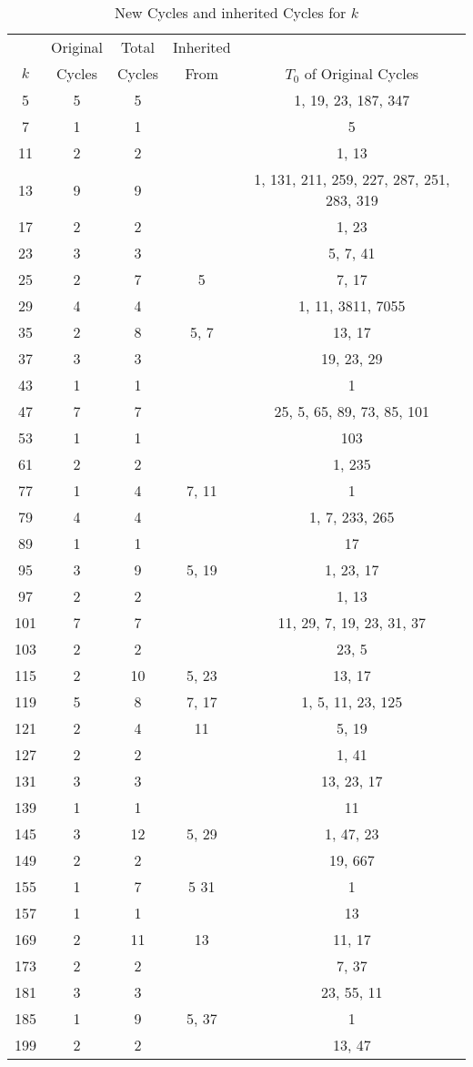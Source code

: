 \documentclass[12pt]{article} %
\begin{document}
\begin{table}[H]
\small
    \centering
\begin{tabular}{|c|c|c|c|c|}
\hline
    & Original    & Total  & Inherited & \\
$k$ & Cycles & Cycles & From      & $T_0$ of Original Cycles\\
\hline
5 & 5 & 5 &  & 1, 19, 23, 187, 347\\
7 &  1 & 1 &  & 5\\
11 &  2 & 2 &  & 1, 13\\
13 &  9 & 9 &  & 1, 131, 211, 259, 227, 287, 251, 283, 319\\
17 &  2 & 2 &  & 1, 23\\
23 &  3 & 3 &  & 5, 7, 41\\
25 &  2 & 7 & 5 & 7, 17\\
29 &  4 & 4 &  & 1, 11, 3811, 7055\\
35 &  2 & 8 & 5, 7 & 13, 17\\
37 &  3 & 3 &  & 19, 23, 29\\
43 &  1 & 1 &  & 1\\
47 &  7 & 7 &  & 25, 5, 65, 89, 73, 85, 101\\
53 &  1 & 1 &  & 103\\
61 &  2 & 2 &  & 1, 235\\
77 &  1 & 4 & 7, 11 & 1\\
79 &  4 & 4 &  & 1, 7, 233, 265\\
89 &  1 & 1 &  & 17\\
95 &  3 & 9 & 5, 19 & 1, 23, 17\\
97 &  2 & 2 &  & 1, 13\\
101 &  7 & 7 &  & 11, 29, 7, 19, 23, 31, 37\\
103 &  2 & 2 &  & 23, 5\\
115 &  2 & 10 & 5, 23 & 13, 17\\
119 &  5 & 8 & 7, 17 & 1, 5, 11, 23, 125\\
121 &  2 & 4 & 11 & 5, 19\\
127 &  2 & 2 &  & 1, 41\\
131 &  3 & 3 &  & 13, 23, 17\\
139 &  1 & 1 &  & 11\\
145 &  3 & 12 & 5, 29 & 1, 47, 23\\
149 &  2 & 2 &  & 19, 667\\
155 &  1 & 7 & 5 31 & 1\\
157 &  1 & 1 &  & 13\\
169 &  2 & 11 & 13 & 11, 17\\
173 &  2 & 2 &  & 7, 37\\
181 &  3 & 3 &  & 23, 55, 11\\
185 &  1 & 9 & 5, 37 & 1\\
199 &  2 & 2 &  & 13, 47\\
\hline
\end{tabular}
\caption{New Cycles and inherited Cycles for $k$}
\label{tabcycles}
\end{table}
\end{document}
